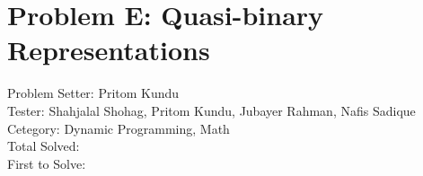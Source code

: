 \section*{Problem E: Quasi-binary Representations}
Problem Setter: Pritom Kundu \\
Tester: Shahjalal Shohag, Pritom Kundu, Jubayer Rahman, Nafis Sadique \\
Cetegory: Dynamic Programming, Math \\
Total Solved:  \\
First to Solve: \\
